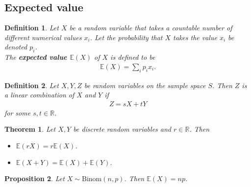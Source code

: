 \documentclass{article}
\theoremstyle{sltheorem}
\newtheorem{definition}{Definition}[section]
\newtheorem{theorem}{Theorem}[section]
\newtheorem{proposition}[theorem]{Proposition}
\newcommand{\R}{\mathbb{R}}
\newcommand{\E}{\mathbb{E}}
\newcommand*\B[1]{\textbf{#1}}
\begin{document}
\subsection{Expected value}
\begin{definition}
    Let $X$ be a random variable that takes a countable number of different
    numerical values $x_i$. Let the probability that $X$ takes the value $x_i$
    be denoted $p_i$.\\
    The \B{expected value $\E(X)$} of $X$ is defined to be
    \begin{align*}
        \E(X) = \sum_i p_i x_i.
    \end{align*}
\end{definition}
\begin{definition}
    Let $X,Y,Z$ be random variables on the sample space $S$.
    Then $Z$ is a linear combination of $X$ and $Y$ if
    \begin{align*}
        Z = sX + tY
    \end{align*}
    for some $s,t\in\R$.
\end{definition}
\begin{theorem}
    Let $X,Y$ be discrete random variables and $r\in\R$. Then
    \begin{itemize}
        \item $\E(rX)=r\E(X)$.
        \item $\E(X + Y) = \E(X) + \E(Y)$.
    \end{itemize}
\end{theorem}
\begin{proposition}
    Let $X\sim\text{Binom}(n,p)$. Then $\E(X)=np$.
\end{proposition}
\end{document}
